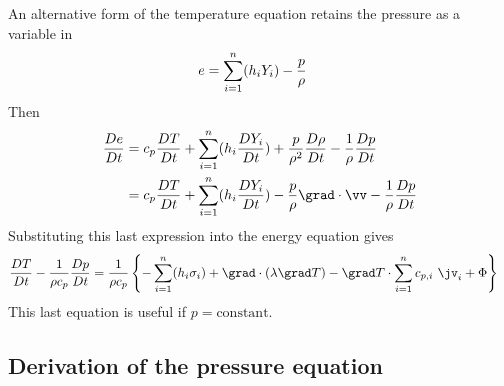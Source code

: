 \documentclass{article}
\begin{document}
 An alternative form of the temperature equation retains the pressure as a variable in
\begin{align*}
  e &= \sum_{i=1}^n( h_i Y_i ) - {p\over \rho}
\end{align*}
Then 
\begin{align*}
  {D e\over Dt} &= c_p {D T\over Dt} + \sumi(h_i{D Y_i\over Dt})
            + {p\over \rho^2} {D \rho\over Dt} - {1\over \rho} {D p\over Dt}  \\
                &= c_p {D T\over Dt} + \sumi(h_i{D Y_i\over Dt}) - {p\over \rho} \grad\cdot\vv - {1\over \rho} {D p\over Dt}
\end{align*}
Substituting this last expression into the energy equation gives
\begin{align}
  {D T\over Dt} - {1\over \rho c_p} {D p\over Dt} & = 
       {1\over \rho c_p}  \left\{ -\sumi (h_i\sigma_i) + \grad\cdot(\lambda\grad T)
      -  \grad T \cdot \sumi c_{p,i} ~\jv_i
              + \Phi \right\} 
\end{align}
This last equation is useful if $p=\mbox{constant}$.

\subsection{Derivation of the pressure equation}\label{sec:pressure}
\end{document}
